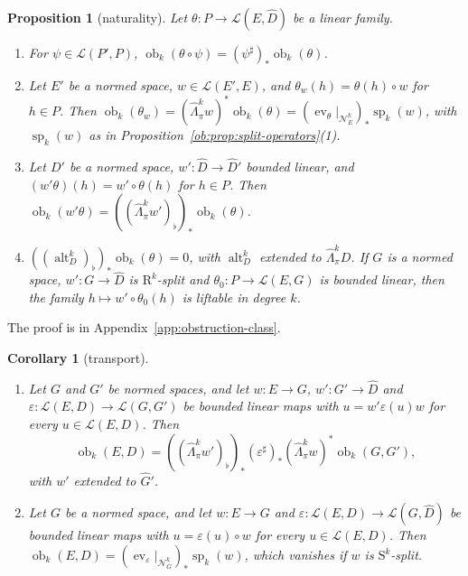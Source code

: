 \documentclass[11pt]{amsart}
\newtheorem{proposition}[theorem]{Proposition}
\newtheorem{corollary}[theorem]{Corollary}
\theoremstyle{definition}
\theoremstyle{remark}
\numberwithin{equation}{section}
\newcommand{\cL}{\mathcal L}
\theoremstyle{plain}
\theoremstyle{definition}
\theoremstyle{plain}
\newcommand{\alt}{\operatorname{alt}}
\newcommand{\ev}{\operatorname{ev}}
\newcommand{\ob}{\operatorname{ob}}
\newcommand{\cN}{\mathcal N}
\begin{document}
\begin{proposition}[naturality]\label{cmb:prop:naturality}
Let $\theta\colon P\to\cL(E,\widehat D)$ be a linear family.
\begin{enumerate}
\item[(a)] For $\psi\in\cL(P',P)$, $\ob_k(\theta\circ\psi)=(\psi^\sharp)_*\ob_k(\theta)$.
\item[(b)] Let $E'$ be a normed space, $w\in\cL(E',E)$, and $\theta_w(h)=\theta(h)\circ w$ for $h\in P$. Then
$\ob_k(\theta_w)=(\widehat\Lambda^k_\pi w)^*\ob_k(\theta)=(\ev_\theta|_{\cN^k_E})_*\operatorname{sp}_k(w)$, with
$\operatorname{sp}_k(w)$ as in Proposition~\ref{ob:prop:split-operators}(1).
\item[(c)] Let $D'$ be a normed space, $w'\colon\widehat D\to\widehat D'$ bounded linear, and $(w'\theta)(h)=w'\circ\theta(h)$
for $h\in P$. Then $\ob_k(w'\theta)=((\widehat\Lambda^k_\pi w')_\flat)_*\ob_k(\theta)$.
\item[(d)] $((\alt^k_D)_\flat)_*\ob_k(\theta)=0$, with $\alt^k_D$ extended to $\widehat\Lambda^k_\pi D$. If $G$ is a normed
space, $w'\colon G\to\widehat D$ is $\mathrm R^k$-split and $\theta_0\colon P\to\cL(E,G)$ is bounded linear, then the family
$h\mapsto w'\circ\theta_0(h)$ is liftable in degree $k$.
\end{enumerate}
\end{proposition}

The proof is in Appendix~\ref{app:obstruction-class}.

\begin{corollary}[transport]\label{cmb:cor:transport}
\begin{enumerate}
\item Let $G$ and $G'$ be normed spaces, and let $w\colon E\to G$, $w'\colon G'\to\widehat D$ and
$\varepsilon\colon\cL(E,D)\to\cL(G,G')$ be bounded linear maps with $u=w'\varepsilon(u)w$ for every $u\in\cL(E,D)$. Then
\[
 \ob_k(E,D)=((\widehat\Lambda^k_\pi w')_\flat)_*(\varepsilon^\sharp)_*(\widehat\Lambda^k_\pi w)^*\ob_k(G,G'),
\]
with $w'$ extended to $\widehat G'$.
\item Let $G$ be a normed space, and let $w\colon E\to G$ and $\varepsilon\colon\cL(E,D)\to\cL(G,\widehat D)$ be bounded linear
maps with $u=\varepsilon(u)\circ w$ for every $u\in\cL(E,D)$. Then $\ob_k(E,D)=(\ev_\varepsilon|_{\cN^k_G})_*\operatorname{sp}_k(w)$,
which vanishes if $w$ is $\mathrm S^k$-split.
\end{enumerate}
\end{corollary}
\end{document}
